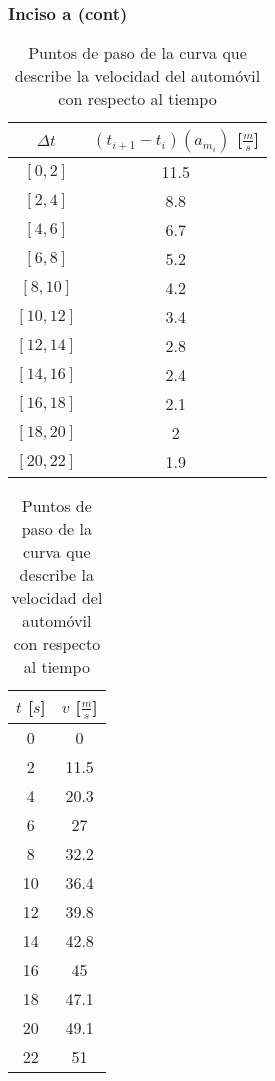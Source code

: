 \documentclass[11pt]{beamer}
\begin{document}
	\begin{frame}
		\frametitle{Inciso a (cont)}
		
		\begin{table}[H]
			\centering
			\begin{tabular}{|c|c|}
				\hline
				$\Delta t$ & $(t_{i+1} - t_{i})(a_{m_{i}})$ [$\frac{m}{s}$]\\
				\hline
				$[0,2]$&11.5\\
				\hline
				$[2,4]$&8.8\\
				\hline
				$[4,6]$&6.7\\
				\hline
				$[6,8]$&5.2\\
				\hline
				$[8,10]$&4.2\\
				\hline
				$[10,12]$&3.4\\
				\hline
				$[12,14]$&2.8\\
				\hline
				$[14,16]$&2.4\\
				\hline
				$[16,18]$&2.1\\
				\hline
				$[18,20]$&2\\
				\hline
				$[20,22]$&1.9\\
				\hline
			\end{tabular}
			\qquad
			\begin{tabular}{|c|c|}
				\hline
				$t$ [$s$] & $v$ [$\frac{m}{s}$]\\
				\hline
				0&0\\
				\hline
				2&11.5\\
				\hline
				4&20.3\\
				\hline
				6&27\\
				\hline
				8&32.2\\
				\hline
				10&36.4\\
				\hline
				12&39.8\\
				\hline
				14&42.8\\
				\hline
				16&45\\
				\hline
				18&47.1\\
				\hline
				20&49.1\\
				\hline
				22&51\\
				\hline
			\end{tabular}
			\caption{Puntos de paso de la curva que describe la velocidad del automóvil con respecto al tiempo}
			\label{tab:Velocidades}
		\end{table}
	\end{frame}
\end{document}
